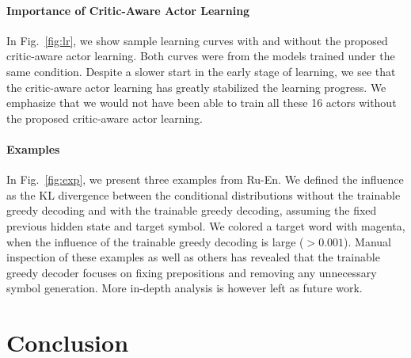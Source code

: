 
\paragraph{Importance of Critic-Aware Actor Learning}
In Fig.~\ref{fig:lr}, we show sample learning curves with and without the proposed critic-aware actor learning. Both curves were from the models trained under the same condition. Despite a slower start in the early stage of learning, we see that the critic-aware actor learning has greatly stabilized the learning progress. We emphasize that we would not have been able to train all these 16 actors without the proposed critic-aware actor learning.

\paragraph{Examples} 
In Fig.~\ref{fig:exp}, we present three examples from Ru-En. We defined the influence as the KL divergence between the conditional distributions without the trainable greedy decoding and with the trainable greedy decoding, assuming the fixed previous hidden state and target symbol. We colored a target word with magenta, when the influence of the trainable greedy decoding is large ($> 0.001$).  Manual inspection of these examples as well as others has revealed that the trainable greedy decoder focuses on fixing prepositions and removing any unnecessary symbol generation. More in-depth analysis is however left as future work. 

\section{Conclusion}

